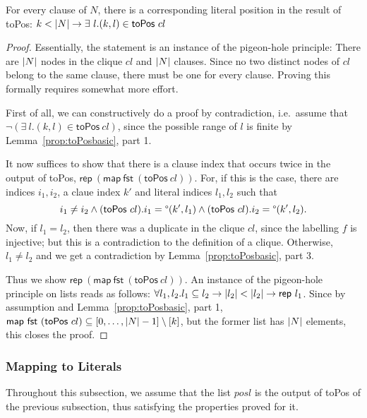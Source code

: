 \documentclass[a4paper,UKenglish,cleveref, autoref]{lipics-v2019}
\begin{document}
\begin{lemma}
  For every clause of $N$, there is a corresponding literal position in the result of \normalfont\textsf{toPos}:
  $ k < |N| \rightarrow \exists~l. (k, l) \in \normalfont\textsf{toPos}~cl $
\end{lemma}
\begin{proof}
  Essentially, the statement is an instance of the pigeon-hole principle: There are $|N|$ nodes in the clique $cl$ and $|N|$ clauses. Since no two distinct nodes of $cl$ belong to the same clause, there must be one for every clause.
  Proving this formally requires somewhat more effort. 

  First of all, we can constructively do a proof by contradiction, i.e.\ assume that $\lnot(\exists~l. (k, l) \in \textsf{toPos}~cl)$, since the possible range of $l$ is finite by Lemma~\ref{prop:toPosbasic}, part 1.

  It now suffices to show that there is a clause index that occurs twice in the output of \textsf{toPos}, $\textsf{rep}~(\textsf{map}~\textsf{fst}~(\textsf{toPos}~cl))$. For, if this is the case, there are indices $i_1, i_2$, a claue index $k'$ and literal indices $l_1, l_2$ such that
  \[ i_1 \neq i_2 \land (\textsf{toPos}~cl).i_1 = \degree(k', l_1) \land (\textsf{toPos}~cl).i_2 = \degree(k', l_2). \]
  Now, if $l_1 = l_2$, then there was a duplicate in the clique $cl$, since the labelling $f$ is injective; but this is a contradiction to the definition of a clique. Otherwise, $l_1 \neq l_2$ and we get a contradiction by Lemma~\ref{prop:toPosbasic}, part 3. 

  Thus we show $\textsf{rep}~(\textsf{map}~\textsf{fst}~(\textsf{toPos}~cl))$. An instance of the pigeon-hole principle on lists reads as follows: 
  $\forall l_1, l_2. l_1 \subseteq l_2 \rightarrow |l_2| < |l_2| \rightarrow \textsf{rep}~l_1$.
  Since by assumption and Lemma~\ref{prop:toPosbasic}, part 1, $\textsf{map}~\textsf{fst}~(\textsf{toPos}~cl) \subseteq [0, \ldots, |N|-1] \setminus [k]$, but the former list has $|N|$ elements, this closes the proof.
\end{proof}

\subsubsection{Mapping to Literals}
Throughout this subsection, we assume that the list $posl$ is the output of \textsf{toPos} of the previous subsection, thus satisfying the properties proved for it.
\end{document}
